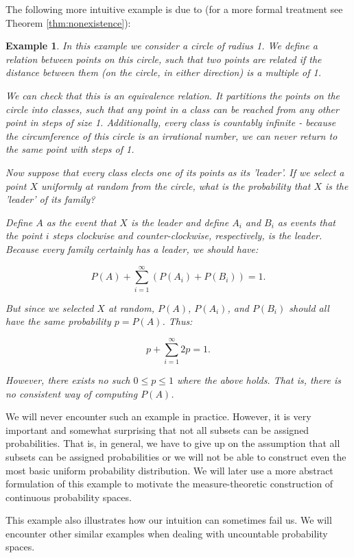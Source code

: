 \documentclass{book}
\theoremstyle{plain}%
\newtheorem{prototheorem}{Example}[section]
\newenvironment{cexample}
   {\colorlet{shadecolor}{gray!10}\begin{shaded}\begin{prototheorem}}
   {\end{prototheorem}\end{shaded}}
\theoremstyle{definition}
\begin{document}
The following more intuitive example is due to \citet[p.~10]{Ross2007} (for a more formal treatment see Theorem \ref{thm:nonexistence}):

\begin{cexample}
In this example we consider a circle of radius 1. We define a relation between points on this circle, such that two points are related if the distance between them (on the circle, in either direction) is a multiple of 1.

We can check that this is an equivalence relation. It partitions the points on the circle into classes, such that any point in a class can be reached from any other point in steps of size 1. Additionally, every class is countably infinite - because the circumference of this circle is an irrational number, we can never return to the same point with steps of 1.

Now suppose that every class elects one of its points as its 'leader'. If we select a point $X$ uniformly at random from the circle, what is the probability that $X$ is the 'leader' of its family?

Define $A$ as the event that $X$ is the leader and define $A_i$ and $B_i$ as events that the point $i$ steps clockwise and counter-clockwise, respectively, is the leader. Because every family certainly has a leader, we should have:

$$P(A) + \sum_{i=1}^\infty \left(P(A_i) + P(B_i)\right) = 1.$$

But since we selected $X$ at random, $P(A)$, $P(A_i)$, and $P(B_i)$ should all have the same probability $p = P(A)$. Thus:

$$p + \sum_{i=1}^\infty 2p = 1.$$

However, there exists no such $0 \leq p \leq 1$ where the above holds. That is, there is no consistent way of computing $P(A)$.
\label{exa:ross}
\end{cexample}

We will never encounter such an example in practice. However, it is very important and somewhat surprising that not all subsets can be assigned probabilities. That is, in general, we have to give up on the assumption that all subsets can be assigned probabilities or we will not be able to construct even the most basic uniform probability distribution. We will later use a more abstract formulation of this example to motivate the measure-theoretic construction of continuous probability spaces.

This example also illustrates how our intuition can sometimes fail us. We will encounter other similar examples when dealing with uncountable probability spaces.
\end{document}
